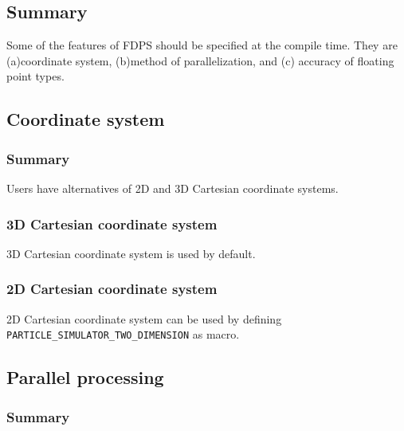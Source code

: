 \subsection{Summary}

Some of the features of FDPS should be specified at the compile time.
They are (a)coordinate system, (b)method of parallelization, and (c) accuracy of floating point types.

\subsection{Coordinate system}
\label{sec:compile_coordinate}

\subsubsection{Summary}

Users have alternatives of 2D and 3D Cartesian coordinate systems.

\subsubsection{3D Cartesian coordinate system}

3D Cartesian coordinate system is used by default.

\subsubsection{2D Cartesian coordinate system}

2D Cartesian coordinate system can be used by defining
\texttt{PARTICLE\_SIMULATOR\_TWO\_DIMENSION} as macro.

\subsection{Parallel processing}

\subsubsection{Summary}

